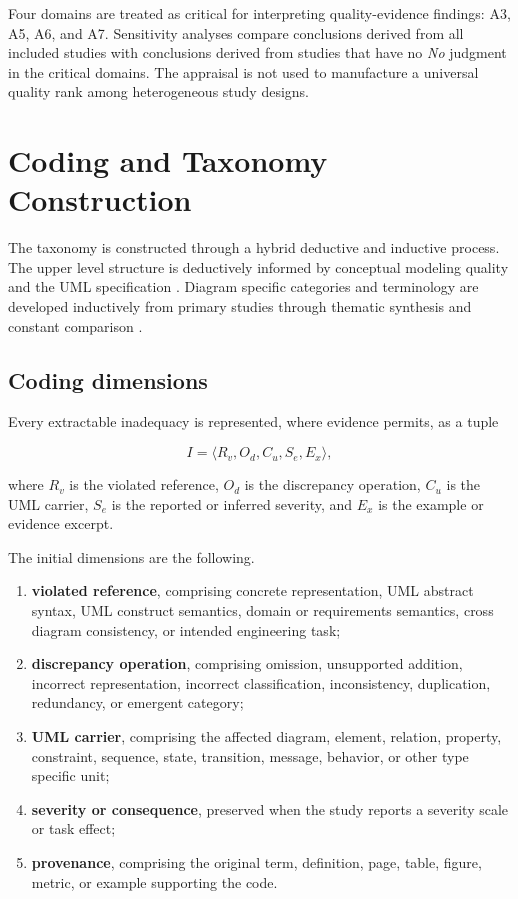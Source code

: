 Four domains are treated as critical for interpreting quality-evidence findings: A3, A5, A6, and A7. Sensitivity analyses compare conclusions derived from all included studies with conclusions derived from studies that have no \textit{No} judgment in the critical domains. The appraisal is not used to manufacture a universal quality rank among heterogeneous study designs.

\section{Coding and Taxonomy Construction}
\label{sec:protocol_coding}

The taxonomy is constructed through a hybrid deductive and inductive process. The upper level structure is deductively informed by conceptual modeling quality and the UML specification \cite{Lindland1994Quality,Krogstie2006Process,OMG2017UML}. Diagram specific categories and terminology are developed inductively from primary studies through thematic synthesis and constant comparison \cite{Cruzes2011Thematic,Krippendorff2018Content}.

\subsection{Coding dimensions}

Every extractable inadequacy is represented, where evidence permits, as a tuple

\begin{equation}
I = \langle R_v, O_d, C_u, S_e, E_x \rangle,
\label{eq:protocol_inadequacy_tuple}
\end{equation}

where $R_v$ is the violated reference, $O_d$ is the discrepancy operation, $C_u$ is the UML carrier, $S_e$ is the reported or inferred severity, and $E_x$ is the example or evidence excerpt.

The initial dimensions are the following.

\begin{enumerate}[label=\roman*)]
    \item \textbf{violated reference}, comprising concrete representation, UML abstract syntax, UML construct semantics, domain or requirements semantics, cross diagram consistency, or intended engineering task;
    \item \textbf{discrepancy operation}, comprising omission, unsupported addition, incorrect representation, incorrect classification, inconsistency, duplication, redundancy, or emergent category;
    \item \textbf{UML carrier}, comprising the affected diagram, element, relation, property, constraint, sequence, state, transition, message, behavior, or other type specific unit;
    \item \textbf{severity or consequence}, preserved when the study reports a severity scale or task effect;
    \item \textbf{provenance}, comprising the original term, definition, page, table, figure, metric, or example supporting the code.
\end{enumerate}

